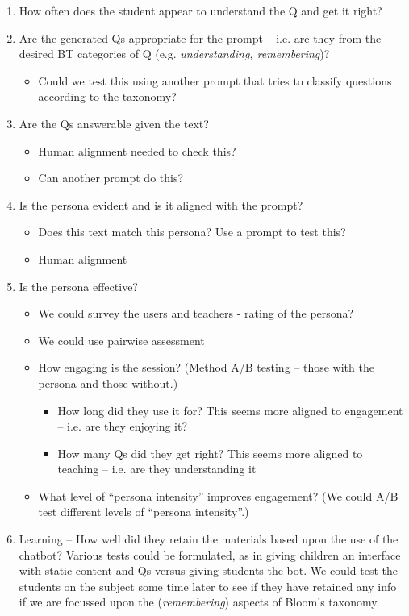 \documentclass{article}
\begin{document}
\begin{enumerate}
    \item How often does the student appear to understand the Q and get it right?
    \item Are the generated Qs appropriate for the prompt – i.e. are they from the desired BT categories of Q (e.g. \textit{understanding, remembering})?
    \begin{itemize}
        \item Could we test this using another prompt that tries to classify questions according to the taxonomy?
    \end{itemize}
    \item Are the Qs answerable given the text?
    \begin{itemize}
        \item Human alignment needed to check this?
        \item Can another prompt do this?
    \end{itemize}
    \item Is the persona evident and is it aligned with the prompt?
    \begin{itemize}
        \item Does this text match this persona? Use a prompt to test this?
        \item Human alignment
    \end{itemize}
    \item Is the persona effective?
    \begin{itemize}
        \item We could survey the users and teachers - rating of the persona?
        \item We could use pairwise assessment
        \item How engaging is the session? (Method A/B testing – those with the persona and those without.)
        \begin{itemize}
            \item How long did they use it for? This seems more aligned to engagement – i.e. are they enjoying it?
            \item How many Qs did they get right? This seems more aligned to teaching – i.e. are they understanding it
        \end{itemize}
        \item What level of “persona intensity” improves engagement? (We could A/B test different levels of “persona intensity”.)
    \end{itemize}
    \item Learning – How well did they retain the materials based upon the use of the chatbot? Various tests could be formulated, as in giving children an interface with static content and Qs versus giving students the bot. We could test the students on the subject some time later to see if they have retained any info if we are focussed upon the (\textit{remembering}) aspects of Bloom’s taxonomy.
\end{enumerate}
\end{document}
